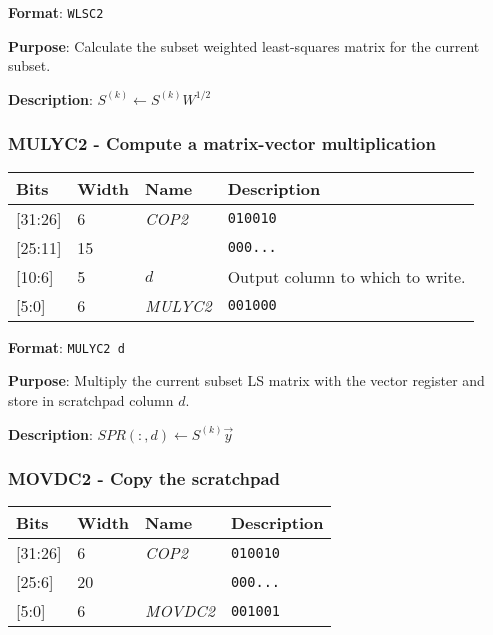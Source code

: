\documentclass[11pt]{article}
\begin{document}
\textbf{Format}: \texttt{WLSC2}

\textbf{Purpose}: Calculate the subset weighted least-squares matrix for the current subset.

\textbf{Description}: $S^{(k)} \leftarrow S^{(k)} W^{1/2}$

\text{}
\subsubsection{MULYC2 - Compute a matrix-vector multiplication}
\text{}

\begin{table}[H] \centering
  \def\arraystretch{1.4}
  \begin{tabular}{|m{2cm}|m{1.5cm}|m{2.5cm}|m{4.5cm}|}
    \hline
    \textbf{Bits} & \textbf{Width} & \textbf{Name} & \textbf{Description}\\ \hline

    [31:26] & 6 & \emph{COP2} & \texttt{010010}\\ \hline

    [25:11] & 15 & & \texttt{000...}\\ \hline
    
    [10:6] & 5 & $d$ & Output column to which to write.\\ \hline

    [5:0] & 6 & \emph{MULYC2} & \texttt{001000}\\ \hline
  \end{tabular}
\end{table}

\textbf{Format}: \texttt{MULYC2 d}

\textbf{Purpose}: Multiply the current subset LS matrix with the vector register and store in scratchpad column $d$.

\textbf{Description}: $SPR(:,d) \leftarrow S^{(k)} \vec{y}$

\text{}
\subsubsection{MOVDC2 - Copy the scratchpad}
\text{}

\begin{table}[H] \centering
  \def\arraystretch{1.4}
  \begin{tabular}{|m{2cm}|m{1.5cm}|m{2.5cm}|m{4.5cm}|}
    \hline
    \textbf{Bits} & \textbf{Width} & \textbf{Name} & \textbf{Description}\\ \hline

    [31:26] & 6 & \emph{COP2} & \texttt{010010}\\ \hline

    [25:6] & 20 & & \texttt{000...}\\ \hline

    [5:0] & 6 & \emph{MOVDC2} & \texttt{001001}\\ \hline
  \end{tabular}
\end{table}
\end{document}
